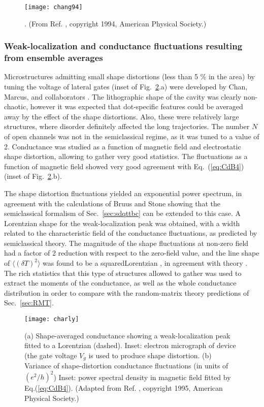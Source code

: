 \documentclass[a4paper,10pt]{article}
\newcommand{\nin}{\noindent}
\newcommand{\dlT}{\delta T}
\begin{document}
\begin{figure}
\setlength{\unitlength}{1mm}
\centerline{\texttt{[image: chang94]}}
\caption{ 
.
(From Ref. \protect\cite{chang94}, copyright 1994, American Physical Society.)}
\label{fig:chang94}
\end{figure}

\subsubsection{Weak-localization and conductance fluctuations resulting from ensemble averages}
\label{subsec:wlae}

\nin Microstructures admitting small shape distortions (less than 5 \% in the area) by tuning the voltage of lateral gates (inset of Fig.~\ref{fig:charly}.a) were developed by Chan, Marcus, and collaborators \cite{marcusgroup2,marcusgroup2b}. The lithographic shape of the cavity was clearly non-chaotic, however it was expected that dot-specific features could be averaged away by the effect of the shape distortions. Also, these were relatively large structures, where disorder definitely affected the long trajectories. The number $N$ of open channels was not in the semiclassical regime, as it was tuned to a value of 2. Conductance was studied as a function of magnetic field and electrostatic shape distortion, allowing to gather very good statistics. The fluctuations as a function of magnetic field showed very good agreement with Eq.~(\ref{eq:CdB4}) (inset of Fig.~\ref{fig:charly}.b). 

\nin The shape distortion fluctuations yielded an exponential power spectrum, in agreement with the calculations of Bruus and Stone \cite{Bruus94} showing that the semiclassical formalism of Sec.~\ref{sec:sdqttbc} can be extended to this case. A Lorentzian shape for the weak-localization peak was obtained, with a width related to the characteristic field of the conductance fluctuations, as predicted by semiclassical theory. The magnitude of the shape fluctuations at non-zero field had a factor of 2 reduction with respect to the zero-field value, and the line shape of $\langle(\dlT)^2\rangle$ was found to be a squaredLorentzian , in agreement with theory \cite{efetov}. The rich statistics that this type of structures allowed to gather was used to extract the moments of the conductance, as well as the whole conductance distribution in order to compare with the random-matrix theory predictions of Sec.~\ref{sec:RMT}. 

\begin{figure}
\setlength{\unitlength}{1mm}
\centerline{\texttt{[image: charly]}}
\caption{
(a) Shape-averaged conductance showing a weak-localization peak fitted
to a Lorentzian (dashed). Inset: electron micrograph of device (the gate
voltage $V_g$ is
used to produce shape distortion. (b) Variance of shape-distortion
conductance fluctuations (in units of $(e^2/h)^2$) Inset: power spectral
density in magnetic field fitted by Eq.(\protect\ref{eq:CdB4}). 
(Adapted from Ref. \protect\cite{marcusgroup2}, copyright 1995, American Physical Society.)}
\label{fig:charly}
\end{figure}
\end{document}
